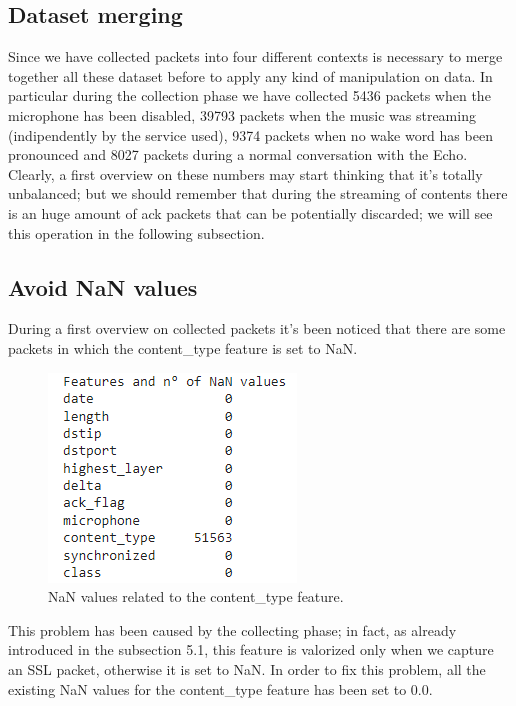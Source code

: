 \documentclass[sigconf]{acmart}
\begin{document}
    \subsection{Dataset merging}
    Since we have collected packets into four different contexts is necessary to merge together all these dataset before to apply any kind of manipulation on data. In particular during the collection phase we have collected 5436 packets when the microphone has been disabled, 39793 packets when the music was streaming (indipendently by the service used), 9374 packets when no wake word has been pronounced and 8027 packets during a normal conversation with the Echo. Clearly, a first overview on these numbers may start thinking that it's totally unbalanced; but we should remember that during the streaming of contents there is an huge amount of ack packets that can be potentially discarded; we will see this operation in the following subsection.

    \subsection{Avoid NaN values}
    During a first overview on collected packets it's been noticed that there are some packets in which the content\_type feature is set to NaN.
    \begin{figure}[h!]
        \includegraphics[width=0.8\linewidth]{img/nan_values.png}
        \caption{NaN values related to the content\_type feature.}
        \label{fig:nan_values}
    \end{figure}
    This problem has been caused by the collecting phase; in fact, as already introduced in the subsection 5.1, this feature is valorized only when we capture an SSL packet, otherwise it is set to NaN. In order to fix this problem, all the existing NaN values for the content\_type feature has been set to 0.0.
\end{document}
